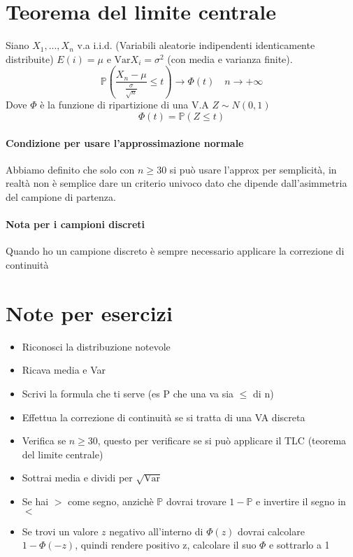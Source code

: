 \section{Teorema del limite centrale}
Siano $X_1, ..., X_n$ v.a i.i.d. (Variabili aleatorie indipendenti identicamente distribuite)
$E(i) = \mu$ e $\text{Var}X_i = \sigma^2$ (con media e varianza finite).
\begin{equation*}
    \mathbb{P} (\frac{X_n-\mu}{\frac{\sigma}{\sqrt{n}}} \leq t) \rightarrow \Phi (t) \quad n \rightarrow + \infty   
\end{equation*}
Dove $\Phi$ è la funzione di ripartizione di una V.A $Z\sim N(0,1)$
\begin{equation*}
    \Phi(t) = \mathbb{P}(Z \leq t)
\end{equation*}
\paragraph*{Condizione per usare l'approssimazione normale} Abbiamo definito 
che solo con $n \geq 30$ si può usare l'approx per semplicità, in realtà non è semplice
dare un criterio univoco dato che dipende dall'asimmetria del campione di partenza.
\paragraph*{Nota per i campioni discreti} Quando ho un campione discreto è sempre necessario
applicare la correzione di continuità 

\section*{Note per esercizi}
\begin{itemize}
    \item Riconosci la distribuzione notevole
    \item Ricava media e Var
    \item Scrivi la formula che ti serve (es P che una va sia $\leq$ di n)
    \item Effettua la correzione di continuità se si tratta di una VA discreta
    \item Verifica se $n\geq 30$, questo per verificare se si può applicare il TLC (teorema del limite centrale)
    \item Sottrai media e dividi per $\sqrt{\text{Var}}$
    \item Se hai $>$ come segno, anzichè $\mathbb{P}$ dovrai trovare $1-\mathbb{P}$ e invertire il segno in $<$
    \item Se trovi un valore $z$ negativo all'interno di $\Phi(z)$ dovrai calcolare $1 - \Phi(-z)$, quindi rendere positivo
    z, calcolare il suo $\Phi$ e sottrarlo a 1
\end{itemize}